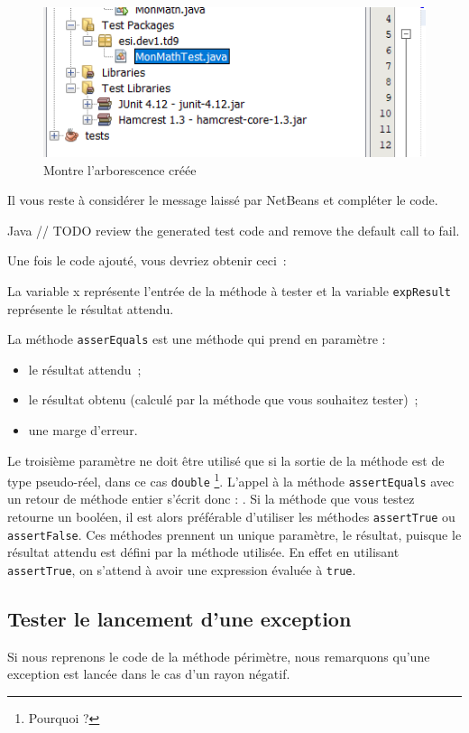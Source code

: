 \documentclass[a4paper,11pt]{style-esi/td}
\begin{document}
	\begin{figure}[hbt!]
		\centering
		\includegraphics[width=.4\textwidth]{images/libraries}
		\caption{Montre l'arborescence créée}
	\end{figure}

	Il vous reste à considérer le message laissé par NetBeans et compléter le code.
	\begin{Code}{Java}
		// TODO review the generated test code and remove the default call to fail.
	\end{Code}

	Une fois le code ajouté, vous devriez obtenir ceci~:

	La variable x représente l’entrée de la méthode à tester et la variable \texttt{expResult} représente le résultat attendu.

	La méthode \texttt{asserEquals} est une méthode qui prend en paramètre :
	\begin{itemize}
		\item le résultat attendu~;
		\item le résultat obtenu (calculé par la méthode que vous souhaitez tester)~;
		\item une marge d’erreur.
	\end{itemize}

	Le troisième paramètre ne doit être utilisé que si la sortie de la méthode
	est de type pseudo-réel, dans ce cas \texttt{double} \footnote{Pourquoi ?}.
	L’appel à la méthode \texttt{assertEquals} avec un retour de méthode entier
	s’écrit donc : .  Si la méthode
	que vous testez retourne un booléen, il est alors préférable d’utiliser les
	méthodes \texttt{assertTrue} ou \texttt{assertFalse}. Ces méthodes prennent
	un unique paramètre, le résultat, puisque le résultat attendu est défini
	par la méthode utilisée. En effet en utilisant \texttt{assertTrue}, on
	s’attend à avoir une expression évaluée à \texttt{true}.

	\subsection{Tester le lancement d'une exception}
	Si nous reprenons le code de la méthode périmètre, nous remarquons qu'une exception est lancée dans le cas d'un rayon négatif. 
	
\end{document}
